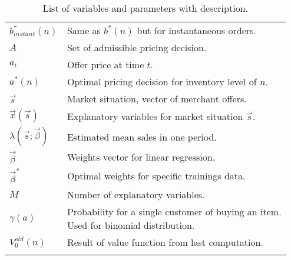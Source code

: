 \begin{longtable}{ll}
		$b^*_{instant}(n)$ & Same as $b^*(n)$ but for instantaneous orders. \\
		$A$ & Set of admissible pricing decision. \\
		$a_t$ & Offer price at time $t$. \\
		$a^*(n)$ & Optimal pricing decision for inventory level of $n$. \\
		$\vec{s}$ & Market situation, vector of merchant offers. \\
		$\vec{x}(\vec{s})$ & Explanatory variables for market situation $\vec{s}$. \\
		$\lambda(\vec{s}; \vec{\beta})$ & Estimated mean sales in one period. \\
		$\vec{\beta}$ & Weights vector for linear regression. \\
		$\vec{\beta}^*$ & Optimal weights for specific trainings data. \\
		$M$ & Number of explanatory variables. \\
		$\gamma(a)$ & \makecell[l]{Probability for a single customer of buying an item. \\ Used for binomial distribution.} \\
		$V_0^{old}(n)$ & Result of value function from last computation. \\
		\bottomrule
	\caption[List of Variables and Parameters]{List of variables and parameters with description.}
	\label{tab:notations}
\end{longtable}
